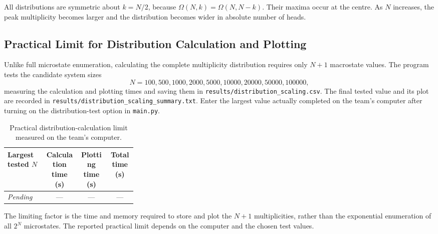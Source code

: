 \documentclass[10pt,a4paper]{article}
\begin{document}
\FloatBarrier

All distributions are symmetric about $k=N/2$, because $\Omega(N,k)=\Omega(N,N-k)$. Their maxima occur at the centre. As $N$ increases, the peak multiplicity becomes larger and the distribution becomes wider in absolute number of heads.

\subsection{Practical Limit for Distribution Calculation and Plotting}
Unlike full microstate enumeration, calculating the complete multiplicity distribution requires only $N+1$ macrostate values. The program tests the candidate system sizes
\[
  N=100,500,1000,2000,5000,10000,20000,50000,100000,
\]
measuring the calculation and plotting times and saving them in \texttt{results/distribution\_scaling.csv}. The final tested value and its plot are recorded in \texttt{results/distribution\_scaling\_summary.txt}. Enter the largest value actually completed on the team's computer after turning on the distribution-test option in \texttt{main.py}.

\begin{table}[htbp]
  \centering
  \caption{Practical distribution-calculation limit measured on the team's computer.}
  \label{tab:distribution-limit}
  \begin{tabular}{p{0.30\linewidth} c c c}
    \toprule
    Largest tested $N$ & Calculation time (s) & Plotting time (s) & Total time (s) \\
    \midrule
    \textit{Pending} & --- & --- & --- \\
    \bottomrule
  \end{tabular}
\end{table}
The limiting factor is the time and memory required to store and plot the $N+1$ multiplicities, rather than the exponential enumeration of all $2^N$ microstates. The reported practical limit depends on the computer and the chosen test values.
\end{document}

